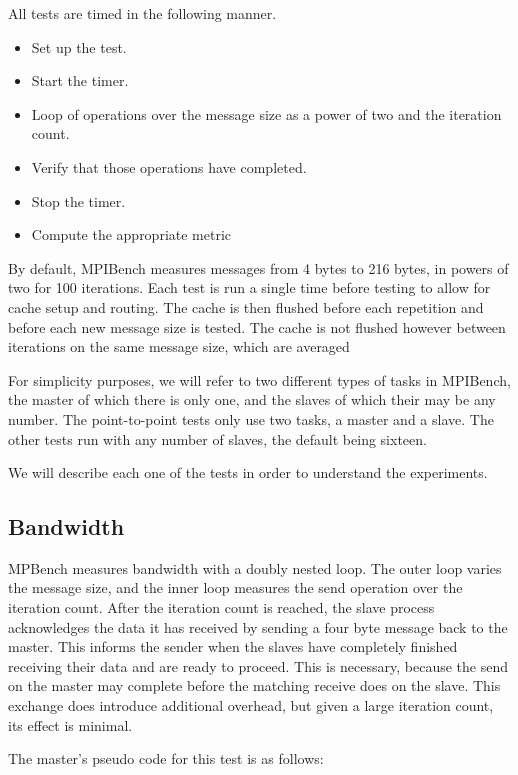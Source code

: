 All tests are timed in the following manner.

\begin{itemize}
    \item Set up the test.
    \item Start the timer.
    \item Loop of operations over the message size as a power of two and the
iteration count.
    \item Verify that those operations have completed.
    \item Stop the timer.
    \item Compute the appropriate metric
\end{itemize}

By default, MPIBench measures messages from 4 bytes to 216 bytes, in powers of
two for 100 iterations. Each test is run a single time before testing to allow
for cache setup and routing. The cache is then flushed before each repetition
and before each new message size is tested. The cache is not flushed however
between iterations on the same message size, which are averaged

For simplicity purposes, we will refer to two different types of tasks in
MPIBench, the master of which there is only one, and the slaves of which their
may be any number. The point-to-point tests only use two tasks, a master and a
slave. The other tests run with any number of slaves, the default being
sixteen.

We will describe each one of the tests in order to understand the experiments.


\subsection{Bandwidth}

MPBench measures bandwidth with a doubly nested loop. The outer loop varies the
message size, and the inner loop measures the send operation over the
iteration count. After the iteration count is reached, the slave process
acknowledges the data it has received by sending a four byte message back to
the master. This informs the sender when the slaves have completely finished
receiving their data and are ready to proceed. This is necessary, because the
send on the master may complete before the matching receive does on the slave.
This exchange does introduce additional overhead, but given a large iteration
count, its effect is minimal.

The master's pseudo code for this test is as follows:

